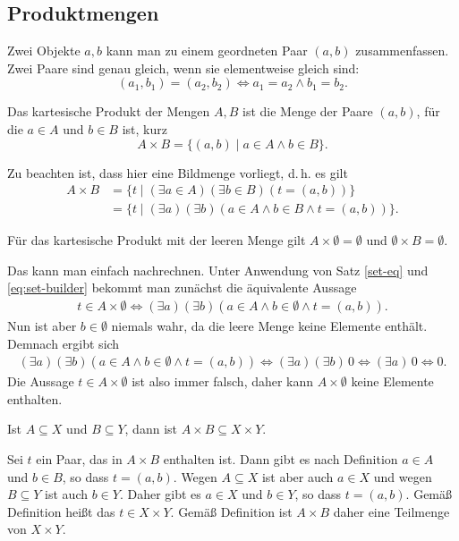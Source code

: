 \newpage
\subsection{Produktmengen}
Zwei Objekte $a,b$ kann man zu einem geordneten Paar $(a,b)$
zusammenfassen. Zwei Paare sind genau gleich, wenn sie
elementweise gleich sind:
\[(a_1,b_1) = (a_2,b_2) \iff a_1=a_2\land b_1=b_2.\]

\begin{Definition}
Das kartesische Produkt der Mengen $A,B$ ist die Menge der
Paare $(a,b)$, für die $a\in A$ und $b\in B$ ist, kurz
\[A\times B = \{(a,b)\mid a\in A\land b\in B\}.\]
\end{Definition}
Zu beachten ist, dass hier eine Bildmenge vorliegt, d.\,h. es gilt
\begin{align*}
A\times B &= \{t\mid(\exists a\in A)(\exists b\in B)(t=(a,b))\}\\
&= \{t\mid(\exists a)(\exists b)(a\in A\land b\in B\land t=(a,b))\}.
\end{align*}

\begin{Satz}
Für das kartesische Produkt mit der leeren Menge gilt $A\times\emptyset=\emptyset$
und $\emptyset\times B=\emptyset$.
\end{Satz}
 Das kann man einfach nachrechnen.
Unter Anwendung von Satz \ref{set-eq} und \eqref{eq:set-builder}
bekommt man zunächst die äquivalente Aussage
\begin{gather*}
t\in A\times\emptyset \iff (\exists a)(\exists b)(a\in A\land b\in\emptyset\land t=(a,b)).
\end{gather*}
Nun ist aber $b\in\emptyset$ niemals wahr, da die leere Menge keine
Elemente enthält. Demnach ergibt sich
\begin{gather*}
(\exists a)(\exists b)(a\in A\land b\in\emptyset\land t=(a,b))
\iff (\exists a)(\exists b)\, 0 \iff (\exists a)\,0\iff 0.
\end{gather*}
Die Aussage $t\in A\times\emptyset$ ist also immer falsch,
daher kann $A\times\emptyset$ keine Elemente enthalten.\;\qedsymbol

\begin{Satz}
Ist $A\subseteq X$ und $B\subseteq Y$, dann ist
$A\times B\subseteq X\times Y$.
\end{Satz}
 Sei $t$ ein Paar, das in
$A\times B$ enthalten ist. Dann gibt es nach Definition
$a\in A$ und $b\in B$, so dass $t=(a,b)$. Wegen
$A\subseteq X$ ist aber auch $a\in X$ und wegen $B\subseteq Y$
ist auch $b\in Y$. Daher gibt es $a\in X$ und $b\in Y$, so dass
$t=(a,b)$. Gemäß Definition heißt das $t\in X\times Y$. Gemäß
Definition ist $A\times B$ daher eine Teilmenge von $X\times Y$.\;\qedsymbol

